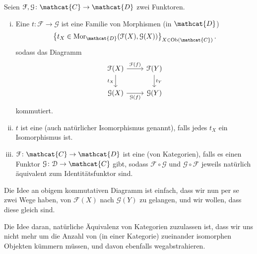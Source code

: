 \begin{definition}\label{def:natürliche-transformation-und-äquivalenz}
    Seien $\mathcal{F},\mathcal{G}\colon  \mathcat{C} \to  \mathcat{D}$ zwei Funktoren. 
    \begin{enumerate}[i)]
        \item 
    Eine  $t\colon  \mathcal{F} \to  \mathcal{G}$ ist eine Familie von Morphismen (in $\mathcat{D}$)
    \[
        \left \{t_X \in  \Mor_{\mathcat{D}}(\mathcal{F}(X),\mathcal{G}(X))\right\} _{X\in \Ob(\mathcat{C})}
    .\] 
    sodass das Diagramm
    \begin{equation*}
        \begin{tikzcd}
            \mathcal{F}(X) \ar{r}{\mathcal{F}(f)} \ar[swap]{d}{t_X} & \mathcal{F}(Y) \ar{d}{t_{Y}} \\
            \mathcal{G}(X) \ar[swap]{r}{\mathcal{G}(f)} & \mathcal{G}(Y)
        \end{tikzcd}
    \end{equation*}
    kommutiert.
\item $t$ ist eine   (auch natürlicher Isomorphismus genannt), falls jedes $t_X$ ein Isomorphismus ist. 
\item $\mathcal{F}\colon  \mathcat{C} \to  \mathcat{D}$ ist eine  (von Kategorien), falls es einen Funktor $\mathcal{G} \colon  \mathcal{D} \to  \mathcat{C}$ gibt, sodass $\mathcal{F} \circ  \mathcal{G}$ und $\mathcal{G} \circ  \mathcal{F}$ jeweils natürlich äquivalent zum Identitätsfunktor sind.
    \end{enumerate}
\end{definition}

\begin{remark*}
    Die Idee an obigem kommutativen Diagramm ist einfach, dass wir nun per se zwei Wege haben, von $\mathcal{F}(X)$ nach $\mathcal{G}(Y)$ zu gelangen, und wir wollen, dass diese gleich sind.
\end{remark*}

\begin{oral}
    Die Idee daran, natürliche Äquivalenz von Kategorien zuzulassen ist, dass wir uns nicht mehr um die Anzahl von (in einer Kategorie) zueinander isomorphen Objekten kümmern müssen, und davon ebenfalls wegabstrahieren.
\end{oral}

